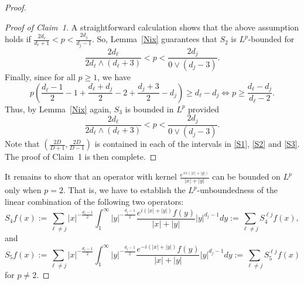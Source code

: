 \documentclass[12pt]{amsart}
\begin{document}
\begin{proof}
\begin{proof}[Proof of Claim~1]
A straightforward calculation shows that the above assumption holds if $\frac{2d_\ell}{d_\ell+1}<p<\frac{2d_j}{d_j-1}$. So, Lemma~\ref{Nix} guarantees that $S_2$ is $L^p$-bounded for
\begin{equation}\label{S2}
    \frac{2d_\ell}{2d_\ell \wedge (d_\ell+3)} <p< \frac{2d_j}{0 \vee (d_j-3)}.
\end{equation}
Finally, since for all $p\ge 1$, we have
\begin{equation*}
    p \left( \frac{d_\ell-1}{2} - 1 + \frac{d_\ell+d_j}{2} - 2 + \frac{d_j+3}{2} - d_j \right) \ge d_\ell-d_j \iff p \ge \frac{d_\ell-d_j}{d_\ell-2}.
\end{equation*}
Thus, by Lemma~\ref{Nix} again, $S_3$ is bounded in $L^p$ provided 
\begin{equation}\label{S3}
    \frac{2d_\ell}{2d_\ell \wedge (d_\ell+3)} < p < \frac{2d_j}{0 \vee (d_j-3)}.
\end{equation}
Note that $\left( \frac{2D}{D+1}, \frac{2D}{D-1} \right)$ is contained in each of the intervals in \eqref{S1}, \eqref{S2} and \eqref{S3}. The proof of Claim~1 is then complete.
\end{proof}


It remains to show that an operator with kernel $\frac{e^{\mp i(|x|+|y|)}}{|x|+|y|}$ can be bounded on $L^p$ only when $p=2$. That is, we have to establish the $L^p$-unboundedness of the linear combination of the following two operators:
\begin{equation*}
S_4f(x) := \sum_{\ell \ne j}|x|^{-\frac{d_\ell-1}{2}} \int_1^\infty |y|^{-\frac{d_j-1}{2}} \frac{e^{i(|x|+|y|)}f(y)}{|x|+|y|} |y|^{d_j-1} dy:= \sum_{\ell \ne j}S_4^{\ell j}f(x), 
\end{equation*}
and
\begin{equation*}
S_5f(x):= \sum_{\ell \ne j} |x|^{-\frac{d_\ell-1}{2}} \int_1^\infty |y|^{-\frac{d_j-1}{2}} \frac{e^{-i(|x|+|y|)}f(y)}{|x|+|y|} |y|^{d_j-1} dy:= \sum_{\ell \ne j}S_5^{\ell j}f(x)
\end{equation*}
for $p \ne 2$.


\end{proof}
\end{document}
